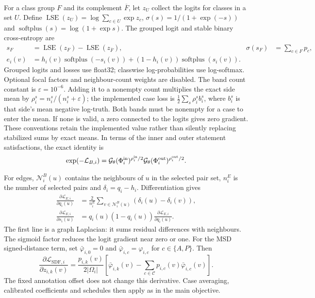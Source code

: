 \documentclass[12pt,a4paper]{article}
\begin{document}
For a class group $F$ and its complement $\overline F$, let $z_U$
collect the logits for classes in a set $U$. Define
$\operatorname{LSE}(z_U)=\log\sum_{c\in U}\exp z_c$,
$\sigma(s)=1/(1+\exp(-s))$ and
$\operatorname{softplus}(s)=\log(1+\exp s)$. The grouped logit and
stable binary cross-entropy are
\begin{align}
s_F&=\operatorname{LSE}(z_F)-\operatorname{LSE}(z_{\overline F}),
 &\sigma(s_F)&=\sum_{c\in F}p_c,\label{eq:grouped-predicate-logit}\\
e_i(v)&=h_i(v)\operatorname{softplus}(-s_i(v))
 +(1-h_i(v))\operatorname{softplus}(s_i(v)).&&\label{eq:band-stable-bce}
\end{align}
Grouped logits and losses use float32; classwise log-probabilities use
log-softmax. Optional focal factors and neighbour-count weights are
disabled. The band count constant is $\varepsilon=10^{-6}$. Adding it
to a nonempty count multiplies the exact side mean by
$\rho_i^s=n_i^s/(n_i^s+\varepsilon)$; the implemented case loss is
$\tfrac12\sum_s\rho_i^s b_i^s$, where $b_i^s$ is that side's mean
negative log-truth. Both bands must be nonempty for a case to enter the
mean. If none is valid, a zero connected to the logits gives zero
gradient. These conventions retain the implemented value rather than
silently replacing stabilized sums by exact means.
In terms of the inner and outer statement satisfactions, the exact
identity is
\begin{equation}
\exp(-\mathcal L_{B,i})=
\mathcal G_\theta(\Phi_i^{\rm in})^{\rho_i^{\rm in}/2}
\mathcal G_\theta(\Phi_i^{\rm out})^{\rho_i^{\rm out}/2}.
\label{eq:balanced-band-satisfaction}
\end{equation}

For edges, $\mathcal N_i^B(u)$ contains the neighbours of $u$ in the
selected pair set, $n_i^E$ is the number of selected pairs and
$\delta_i=q_i-h_i$. Differentiation gives
\begin{equation}
\begin{aligned}
\frac{\partial\mathcal L_{E,i}}{\partial q_i(u)}
 &=\frac{2}{n_i^E}\sum_{v\in\mathcal N_i^B(u)}
     (\delta_i(u)-\delta_i(v)),\\
\frac{\partial\mathcal L_{E,i}}{\partial s_i(u)}
 &=q_i(u)(1-q_i(u))\frac{\partial\mathcal L_{E,i}}{\partial q_i(u)}.
\end{aligned}\label{eq:edge-logit-gradient}
\end{equation}
The first line is a graph Laplacian: it sums residual differences with
neighbours. The sigmoid factor reduces the logit gradient near zero or
one. For the MSD signed-distance term, set $\bar\varphi_{i,0}=0$ and
$\bar\varphi_{i,c}=\varphi_{i,c}$ for $c\in\{A,P\}$. Then
\begin{equation}
\frac{\partial\mathcal L_{\mathrm{SDF},i}}{\partial z_{i,k}(v)}
=\frac{p_{i,k}(v)}{2|\Omega_i|}
 \left[\bar\varphi_{i,k}(v)-\sum_{c\in\mathcal C}
 p_{i,c}(v)\bar\varphi_{i,c}(v)\right].
\label{eq:sdf-logit-gradient}
\end{equation}
The fixed annotation offset does not change this derivative. Case
averaging, calibrated coefficients and schedules then apply as in the
main objective.
\end{document}
